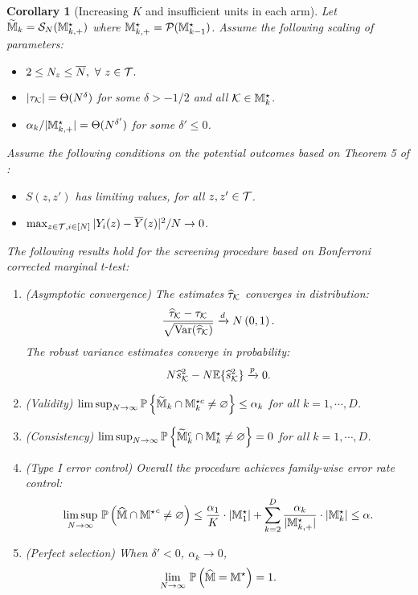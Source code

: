 \documentclass[12pt]{article}
\newtheorem{corollary}{Corollary}
\begin{document}
\begin{corollary}[Increasing $K$ and insufficient units in each arm]\label{cor:marginal-t-grow}
Let $\widetilde{{\mathbb{M}}}_{k} = {\mathcal{S}}_N({\mathbb{M}}^{\star}_{k,+})$ where ${\mathbb{M}}^{\star}_{k,+} = {\mathcal{P}}({\mathbb{M}}^{\star}_{k-1})$. Assume the following scaling of parameters:
\begin{itemize}
    \item $2\le N_z\le \overline{N}, ~\forall ~ z\in{\mathcal{T}}.$
    \item $|\tau_{\mathcal{K}}| =  \Theta(N^\delta)$ for some $\delta > -1/2$ and all ${\mathcal{K}}\in{\mathbb{M}}_k^\star$.
    \item ${\alpha_k}/{|{\mathbb{M}}^{\star}_{k,+}|} =  \Theta(N^{\delta'})$ for some $\delta'\le 0$.
\end{itemize} 
Assume the following conditions on the potential outcomes based on Theorem 5 of \cite{li2017general}:
\begin{itemize}
    \item $S(z,z')$ has limiting values, for all $z,z'\in{\mathcal{T}}$. 
    \item $\max_{z\in{\mathcal{T}},i\in[N]} |Y_i(z) - \overline{Y}(z)|^2 /N \to 0$.
\end{itemize}
The following results hold for the  screening procedure based on Bonferroni corrected marginal t-test:
\begin{enumerate}
    \item (Asymptotic convergence) The estimates ${\widehat{\tau}}_{\mathcal{K}}$ converges in distribution:
    \begin{align*}
        \frac{{\widehat{\tau}}_{{\mathcal{K}}} - \tau_{\mathcal{K}}}{\sqrt{\operatorname{Var}({\widehat{\tau}}_{\mathcal{K}})}} \xrightarrow{d} N\left(0,1\right).
    \end{align*}
    The robust variance estimates converge in probability:
    \begin{align*}
        N\widehat{s}^2_{\mathcal{K}} - N{\mathbb{E}}\{\widehat{s}_{\mathcal{K}}^2\} \xrightarrow{p} 0.
    \end{align*}
    
    \item (Validity) $\lim\sup_{N\to\infty}{\mathbb{P}}\left\{\widetilde{{\mathbb{M}}}_{k}\cap{\mathbb{M}}^{\star c}_k\neq \varnothing\right\}\le \alpha_k$ for all $k=1,\cdots,D$.
    \item (Consistency) $\lim\sup_{N\to\infty}{\mathbb{P}}\left\{\widetilde{{\mathbb{M}}}_{k}^c\cap{\mathbb{M}}^{\star}_k\neq \varnothing\right\} = 0$ for all $k=1,\cdots,D$.
    \item (Type I error control) Overall the procedure achieves family-wise error rate control:
    \begin{align*}
    \underset{N\to\infty}{\lim\sup}~{\mathbb{P}}\left(\widehat{{\mathbb{M}}}\cap{{\mathbb{M}}^\star}^c\neq \varnothing\right)
    \le 
    \frac{\alpha_1}{K}\cdot|{\mathbb{M}}_1^\star| + \sum_{k=2}^D \frac{\alpha_k}{|{\mathbb{M}}^\star_{k,+}|}\cdot|{\mathbb{M}}^\star_k| \le \alpha.
    \end{align*}
    \item (Perfect selection) When $\delta'<0$, $\alpha_k\to0$, 
    \begin{align*}
    \underset{N\to\infty}{\lim}~{\mathbb{P}}\left(\widehat{{\mathbb{M}}} = {{\mathbb{M}}^\star}  \right)
     = 1.
    \end{align*}
\end{enumerate}

\end{corollary}
\end{document}
